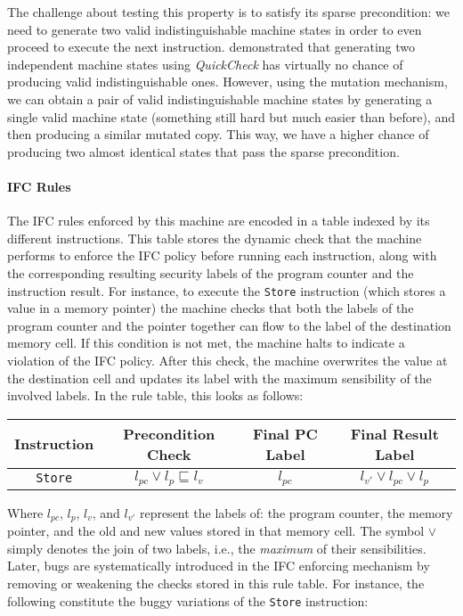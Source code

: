 \documentclass[sigconf,review,anonymous]{acmart}
\newcommand{\quickcheck}{\textit{QuickCheck}\xspace}
\begin{document}
The challenge about testing this property is to satisfy its sparse precondition:
we need to generate two valid indistinguishable machine states in order to even
proceed to execute the next instruction.
%
\citeauthor{lampropoulos2019coverage} demonstrated that generating two
independent machine states using \quickcheck has virtually no chance of
producing valid indistinguishable ones.
%
However, using the mutation mechanism, we can obtain a pair of valid
indistinguishable machine states by generating a single valid machine state
(something still hard but much easier than before), and then producing a similar
mutated copy.
%
This way, we have a higher chance of producing two almost identical states that
pass the sparse precondition.

\paragraph{IFC Rules}

The IFC rules enforced by this machine are encoded in a table indexed by its
different instructions.
%
This table stores the dynamic check that the machine performs to enforce the IFC
policy before running each instruction, along with the corresponding resulting
security labels of the program counter and the instruction result.
%
For instance, to execute the \texttt{Store} instruction (which stores a value in
a memory pointer) the machine checks that both the labels of the program counter
and the pointer together can flow to the label of the destination memory cell.
%
If this condition is not met, the machine halts to indicate a violation of the
IFC policy.
%
After this check, the machine overwrites the value at the destination cell and
updates its label with the maximum sensibility of the involved labels.
%
In the rule table, this looks as follows:

\begin{center}
\scriptsize
\begin{tabular}{|c|c|c|c|}
\hline
\textbf{Instruction} & \textbf{Precondition Check} & \textbf{Final PC Label} & \textbf{Final Result Label} \\
\hline
\texttt{Store}
& $l_{pc} \vee l_{p} \sqsubseteq l_{v}$ & $l_{pc}$ & $l_{v'} \vee l_{pc} \vee l_{p}$ \\
\hline
\end{tabular}
\end{center}

\noindent Where $l_{pc}$, $l_{p}$, $l_{v}$, and $l_{v'}$ represent the labels
of: the program counter, the memory pointer, and the old and new values stored in
that memory cell.
%
The symbol $\vee$ simply denotes the join of two labels, i.e., the
\emph{maximum} of their sensibilities.
%
Later, bugs are systematically introduced in the IFC enforcing mechanism by
removing or weakening the checks stored in this rule table.
%
For instance, the following constitute the buggy variations of the
\texttt{Store} instruction:
\end{document}
